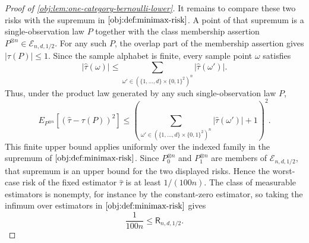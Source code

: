 \begin{proof}[Proof of \cref{obj:lem:one-category-bernoulli-lower}]
It remains to compare these two risks with the supremum in \(\cref{obj:def:minimax-risk}\). A point of that supremum is a single-observation law \(P\) together with the class membership assertion \(P^{\otimes n}\in\mathcal E_{n,d,1/2}\). For any such \(P\), the overlap part of the membership assertion gives \(|\tau(P)|\le1\). Since the sample alphabet is finite, every sample point \(\omega\) satisfies
\[
|\widehat\tau(\omega)|
\le
\sum_{\omega'\in(\{1,
\ldots,d\}\times\{0,1\}^2)^n}|\widehat\tau(\omega')| .
\]
Thus, under the product law generated by any such single-observation law \(P\),
\[
E_{P^{\otimes n}}\!\left[(\widehat\tau-\tau(P))^2\right]
\le
\left(
\sum_{\omega'\in(\{1,\ldots,d\}\times\{0,1\}^2)^n}|\widehat\tau(\omega')|+1
\right)^2 .
\]
This finite upper bound applies uniformly over the indexed family in the supremum of \(\cref{obj:def:minimax-risk}\). Since \(P_0^{\otimes n}\) and \(P_1^{\otimes n}\) are members of \(\mathcal E_{n,d,1/2}\), that supremum is an upper bound for the two displayed risks. Hence the worst-case risk of the fixed estimator \(\widehat\tau\) is at least \(1/(100n)\). The class of measurable estimators is nonempty, for instance by the constant-zero estimator, so taking the infimum over estimators in \(\cref{obj:def:minimax-risk}\) gives
\[
\frac1{100n}\le \mathsf R_{n,d,1/2}.
\]
\end{proof}
